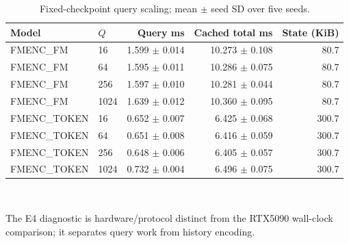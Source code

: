 \begin{table}[t]
\centering
\scriptsize
\caption{Fixed-checkpoint query scaling; mean $\pm$ seed SD over five seeds.}
\label{tab:rebuttal-query}
\begin{tabular}{llrrr}
\toprule
Model & $Q$ & Query ms & Cached total ms & State (KiB) \\
\midrule
FMENC\_FM & 16 & 1.599 $\pm$ 0.014 & 10.273 $\pm$ 0.108 & 80.7 \\
FMENC\_FM & 64 & 1.595 $\pm$ 0.011 & 10.286 $\pm$ 0.075 & 80.7 \\
FMENC\_FM & 256 & 1.597 $\pm$ 0.010 & 10.281 $\pm$ 0.044 & 80.7 \\
FMENC\_FM & 1024 & 1.639 $\pm$ 0.012 & 10.360 $\pm$ 0.095 & 80.7 \\
FMENC\_TOKEN & 16 & 0.652 $\pm$ 0.007 & 6.425 $\pm$ 0.068 & 300.7 \\
FMENC\_TOKEN & 64 & 0.651 $\pm$ 0.008 & 6.416 $\pm$ 0.059 & 300.7 \\
FMENC\_TOKEN & 256 & 0.648 $\pm$ 0.006 & 6.405 $\pm$ 0.057 & 300.7 \\
FMENC\_TOKEN & 1024 & 0.732 $\pm$ 0.004 & 6.496 $\pm$ 0.075 & 300.7 \\
\bottomrule
\end{tabular}
\\[-1mm]
\begin{minipage}{0.96\linewidth}\footnotesize The E4 diagnostic is hardware/protocol distinct from the RTX5090 wall-clock comparison; it separates query work from history encoding.\end{minipage}
\end{table}

